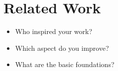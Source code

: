 
\section{Related Work}
\label{sec:related}
\begin{itemize}
	\item Who inspired your work?
	\item Which aspect do you improve?
	\item What are the basic foundations?
\end{itemize}